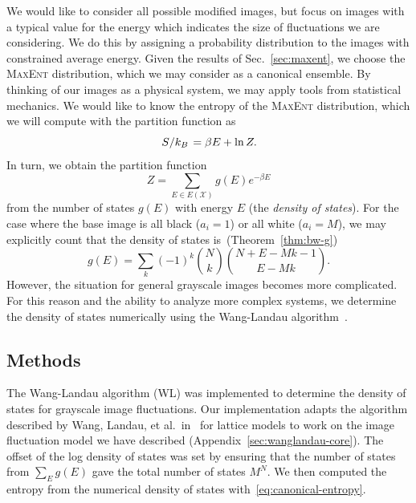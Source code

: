\documentclass[aps,reprint,floatfix]{revtex4-2}
\renewcommand\mathrm\textnormal%
\theoremstyle{plain}
\theoremstyle{definition}
\renewcommand\ln{\operatorname{\mathrm{ln}}}
\begin{document}
We would like to consider all possible modified images, but focus on images with
a typical value for the energy which indicates the size of fluctuations we are
considering. We do this by assigning a probability distribution to the images
with constrained average energy. Given the results of Sec.~\ref{sec:maxent}, we
choose the \textsc{MaxEnt} distribution, which we may consider as a canonical
ensemble. By thinking of our images as a physical system, we may apply tools
from statistical mechanics. We would like to know the entropy of the
\textsc{MaxEnt} distribution, which we will compute with the partition function as
\begin{equation}
  \flatfrac{S}{k_B}
  = \beta E + \ln Z.
  \label{eq:canonical-entropy}
\end{equation}
In turn, we obtain the partition function
\begin{equation}
  Z
  = \sum_{E \in E(\mathcal{X})} g(E) e^{-\beta E}
  \label{eq:partition-function}
\end{equation}
from the number of states $g(E)$ with energy $E$ (the \emph{density of states}).
For the case where the base image is all black ($a_i = 1$) or all white ($a_i =
M$), we may explicitly count that the density of states
is~(Theorem~\ref{thm:bw-g})
\begin{equation}
  g(E)
  = \sum_k {(-1)}^k \binom{N}{k} \binom{N + E - Mk - 1}{E - Mk}.
  \label{eq:bw-g}
\end{equation}
However, the situation for general grayscale images becomes more complicated.
For this reason and the ability to analyze more complex systems, we determine
the density of states numerically using the Wang-Landau
algorithm~\cite{wanglandau}.

\subsection{Methods}\label{sec:wl-methods}

The Wang-Landau algorithm (WL) was implemented to determine the density of
states for grayscale image fluctuations. Our implementation adapts the algorithm
described by Wang, Landau, et al.\ in~\cite{wanglandau,wanglandau-ajp} for
lattice models to work on the image fluctuation model we have described
(Appendix~\ref{sec:wanglandau-core}). The offset of the log density of states
was set by ensuring that the number of states from $\sum_E g(E)$ gave the total
number of states $M^N$. We then computed the entropy from the numerical density
of states with~\eqref{eq:canonical-entropy}.
\end{document}
